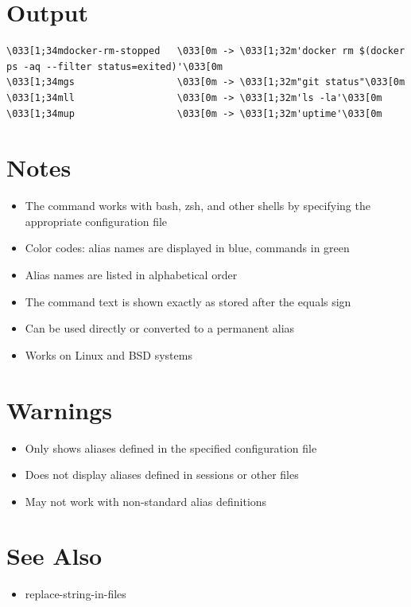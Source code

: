 \documentclass[openany]{book}
\begin{document}
\section*{Output}
\begin{lstlisting}
\033[1;34mdocker-rm-stopped   \033[0m -> \033[1;32m'docker rm $(docker ps -aq --filter status=exited)'\033[0m
\033[1;34mgs                  \033[0m -> \033[1;32m"git status"\033[0m
\033[1;34mll                  \033[0m -> \033[1;32m'ls -la'\033[0m
\033[1;34mup                  \033[0m -> \033[1;32m'uptime'\033[0m
\end{lstlisting}

\section*{Notes}
\begin{itemize}
  \item The command works with bash, zsh, and other shells by specifying the appropriate configuration file
  \item Color codes: alias names are displayed in blue, commands in green
  \item Alias names are listed in alphabetical order
  \item The command text is shown exactly as stored after the equals sign
  \item Can be used directly or converted to a permanent alias
  \item Works on Linux and BSD systems
\end{itemize}

\section*{Warnings}
\begin{itemize}
  \item Only shows aliases defined in the specified configuration file
  \item Does not display aliases defined in sessions or other files
  \item May not work with non-standard alias definitions
\end{itemize}

\section*{See Also}
\begin{itemize}
  \item replace-string-in-files
\end{itemize}
\end{document}
